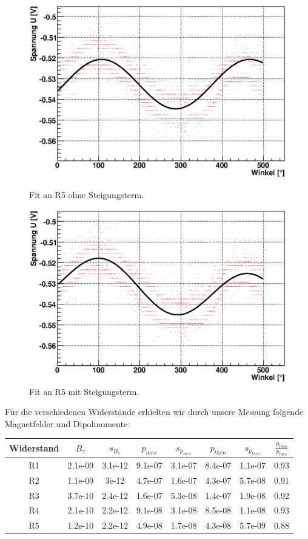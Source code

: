 \documentclass[12pt]{article}
\begin{document}
\begin{figure}[H]  
\begin{minipage}{0.5\linewidth}
\centering
\includegraphics[width=0.9\linewidth]{pictures/R5_ohne.eps}
\caption{Fit an R5 ohne Steigungsterm.}
\end{minipage}
\begin{minipage}{0.5\linewidth}
\centering 
\includegraphics[width=0.9\linewidth]{pictures/R5_mit.eps}
\caption{Fit an R5 mit Steigungsterm.}
\end{minipage}
\end{figure}

Für die verschiedenen Widerstände erhielten wir durch unsere Messung folgende Magnetfelder und Dipolmomente:
\begin{center}
\begin{tabular}{|c|cc|cc|cc|c|}
\hline
Widerstand & $B_z$ & $s_{B_z}$ & $p_{mes}$ & $s_{p_{mes}}$ & $p_{theo}$ & $s_{p_{theo}}$ & $\frac{p_{theo}}{p_{mes}}$ \\
\hline
R1 & 2.1e-09 & 3.1e-12 & 9.1e-07 & 3.1e-07 & 8.4e-07 & 1.1e-07 & 0.93 \\
R2 & 1.1e-09 & 3e-12 & 4.7e-07 & 1.6e-07 & 4.3e-07 & 5.7e-08 & 0.91 \\
R3 & 3.7e-10 & 2.4e-12 & 1.6e-07 & 5.3e-08 & 1.4e-07 & 1.9e-08 & 0.92 \\
R4 & 2.1e-10 & 2.2e-12 & 9.1e-08 & 3.1e-08 & 8.5e-08 & 1.1e-08 & 0.93 \\
R5 & 1.2e-10 & 2.2e-12 & 4.9e-08 & 1.7e-08 & 4.3e-08 & 5.7e-09 & 0.88 \\
\hline
\end{tabular}
\end{center}
\end{document}
